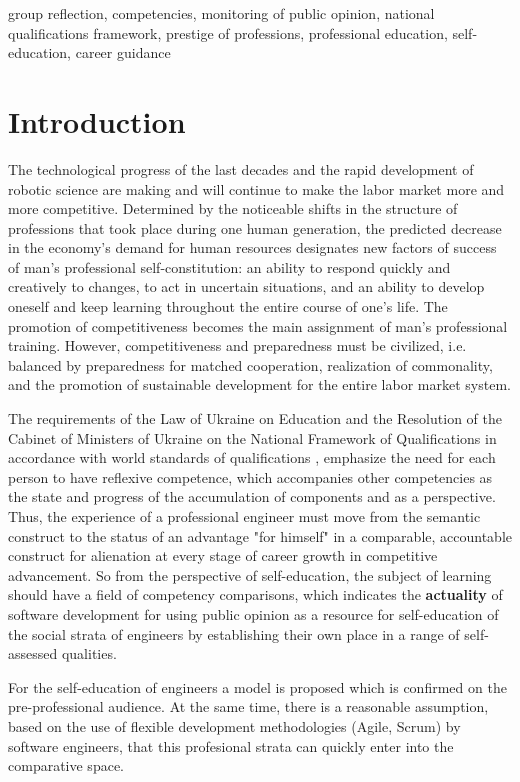 \documentclass[conference]{IEEEtran}
\begin{document}
\begin{IEEEkeywords}
group reflection,
competencies,
monitoring of public opinion,
national qualifications framework,
prestige of professions,
professional education,
self-education,
career guidance
\end{IEEEkeywords}

\section{Introduction}
The technological progress of the last decades and the rapid development of robotic science are making and will continue to make the labor market more and more competitive. Determined by the noticeable shifts in the structure of professions that took place during one human generation, the predicted decrease in the economy’s demand for human resources designates new factors of success of man’s professional self-constitution: an ability to respond quickly and creatively to changes, to act in uncertain situations, and an ability to develop oneself and keep learning throughout the entire course of one’s life. The promotion of competitiveness becomes the main assignment of man’s professional training. However, competitiveness and preparedness must be civilized, i.e. balanced by preparedness for matched cooperation, realization of commonality, and the promotion of sustainable development for the entire labor market system.

The requirements of the Law of Ukraine on Education \cite{b18} and the Resolution of the Cabinet of Ministers of Ukraine on the National Framework of Qualifications \cite{b21,b19} in accordance with world standards of qualifications \cite{b20}, emphasize the need for each person to have reflexive competence, which accompanies other competencies as the state and progress of the accumulation of components and as a perspective. Thus, the experience of a professional engineer must move from the semantic construct to the status of an advantage "for himself" in a comparable, accountable construct for alienation at every stage of career growth in competitive advancement. So from the perspective of self-education, the subject of learning should have a field of competency comparisons, which indicates the \textbf{actuality} of software development for using public opinion as a resource for self-education of the social strata of engineers by establishing their own place in a range of self-assessed qualities.

For the self-education of engineers a model is proposed which is confirmed on the pre-professional audience. At the same time, there is a reasonable assumption, based on the use of flexible development methodologies (Agile, Scrum) by software engineers, that this profesional strata can quickly enter into the comparative space.
\end{document}
